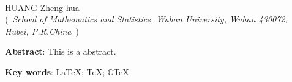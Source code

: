 \documentclass[12pt,a4paper,twoside]{article}
\begin{document}
\vspace{2em}
\begin{center}
 \textbf{\Large      }\\[2em]

 HUANG Zheng-hua \\[0.5em]
 (~{\small \textit{School of Mathematics and Statistics, Wuhan University, Wuhan 430072, Hubei, P.R.China}~})
\end{center}

\vspace{0.5cm}
\noindent\textbf{Abstract}: This is a abstract.

 \noindent\textbf{Key words}:  \LaTeX{}; \TeX{}; $\mathbb{C}$\!\TeX{}


\clearpage
\end{document}
